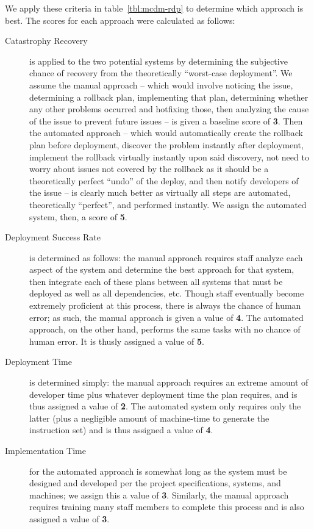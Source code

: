 \documentclass[12pt]{article}
\begin{document}
We apply these criteria in table~\ref{tbl:mcdm-rdp} to determine which approach is best. The scores for each approach were calculated as follows:
\begin{description}
\item[Catastrophy Recovery] is applied to the two potential systems by determining the subjective chance of recovery from the theoretically ``worst-case deployment''. We assume the manual approach -- which would involve noticing the issue, determining a rollback plan, implementing that plan, determining whether any other problems occurred and hotfixing those, then analyzing the cause of the issue to prevent future issues -- is given a baseline score of {\bf 3}. Then the automated approach -- which would automatically create the rollback plan before deployment, discover the problem instantly after deployment, implement the rollback virtually instantly upon said discovery, not need to worry about issues not covered by the rollback as it should be a theoretically perfect ``undo'' of the deploy, and then notify developers of the issue -- is clearly much better as virtually all steps are automated, theoretically ``perfect'', and performed instantly. We assign the automated system, then, a score of {\bf 5}.
\item[Deployment Success Rate] is determined as follows: the manual approach requires staff analyze each aspect of the system and determine the best approach for that system, then integrate each of these plans between all systems that must be deployed as well as all dependencies, etc. Though staff eventually become extremely proficient at this process, there is always the chance of human error; as such, the manual approach is given a value of {\bf 4}. The automated approach, on the other hand, performs the same tasks with no chance of human error. It is thusly assigned a value of {\bf 5}.
\item[Deployment Time] is determined simply: the manual approach requires an extreme amount of developer time plus whatever deployment time the plan requires, and is thus assigned a value of {\bf 2}. The automated system only requires only the latter (plus a negligible amount of machine-time to generate the instruction set) and is thus assigned a value of {\bf 4}.
\item[Implementation Time] for the automated approach is somewhat long as the system must be designed and developed per the project specifications, systems, and machines; we assign this a value of {\bf 3}. Similarly, the manual approach requires training many staff members to complete this process and is also assigned a value of {\bf 3}.

\end{description}
\end{document}
